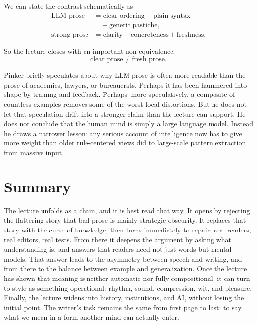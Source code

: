 We can state the contrast schematically as
\begin{align}
\text{LLM prose}
&= \text{clear ordering} + \text{plain syntax} \\
&\quad + \text{generic pastiche}, \\
\text{strong prose} &= \text{clarity} + \text{concreteness} + \text{freshness}.
\end{align}

So the lecture closes with an important non-equivalence:
\begin{equation}
\text{clear prose} \neq \text{fresh prose}.
\end{equation}

Pinker briefly speculates about why LLM prose is often more readable than the prose of academics, lawyers, or bureaucrats. Perhaps it has been hammered into shape by training and feedback. Perhaps, more speculatively, a composite of countless examples removes some of the worst local distortions. But he does not let that speculation drift into a stronger claim than the lecture can support. He does not conclude that the human mind is simply a large language model. Instead he draws a narrower lesson: any serious account of intelligence now has to give more weight than older rule-centered views did to large-scale pattern extraction from massive input.

\section{Summary}

The lecture unfolds as a chain, and it is best read that way. It opens by rejecting the flattering story that bad prose is mainly strategic obscurity. It replaces that story with the curse of knowledge, then turns immediately to repair: real readers, real editors, real tests. From there it deepens the argument by asking what understanding is, and answers that readers need not just words but mental models. That answer leads to the asymmetry between speech and writing, and from there to the balance between example and generalization. Once the lecture has shown that meaning is neither automatic nor fully compositional, it can turn to style as something operational: rhythm, sound, compression, wit, and pleasure. Finally, the lecture widens into history, institutions, and AI, without losing the initial point. The writer's task remains the same from first page to last: to say what we mean in a form another mind can actually enter.
